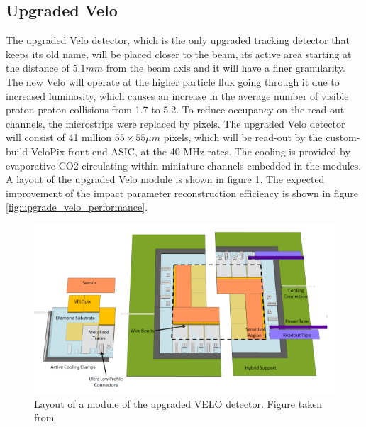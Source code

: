 \subsection{Upgraded Velo}
The upgraded Velo detector, which is the only upgraded tracking detector that keeps its old name, will be placed closer to the beam, its active area starting at the distance of $5.1 mm$ from the beam axis and it will have a finer granularity. The new Velo will operate at the higher particle flux going through it due to increased luminosity, which causes an increase in the average number of visible proton-proton collisions from 1.7 to 5.2. To reduce occupancy on the read-out channels, the microstrips were replaced by pixels. The upgraded Velo detector will consist of 41 million $55\times 55 \mu m$ pixels, which will be read-out by the custom-build VeloPix front-end ASIC, at the 40 MHz rates. 
The cooling is provided by evaporative CO2 circulating within miniature channels embedded in the modules.
A layout of the upgraded Velo module is shown in figure \ref{fig:veloUpgradeModule}. 
The expected improvement of the impact parameter reconstruction efficiency is shown in figure \ref{fig:upgrade_velo_performance}.    

\begin{figure}[!h]
\centering
\includegraphics[width=\linewidth]{figures/Velo_upgraded_module.PNG}
\caption{Layout of a module of the upgraded VELO detector. Figure taken from \cite{velo_upgrade_tdr}
\label{fig:veloUpgradeModule}}
\end{figure}




